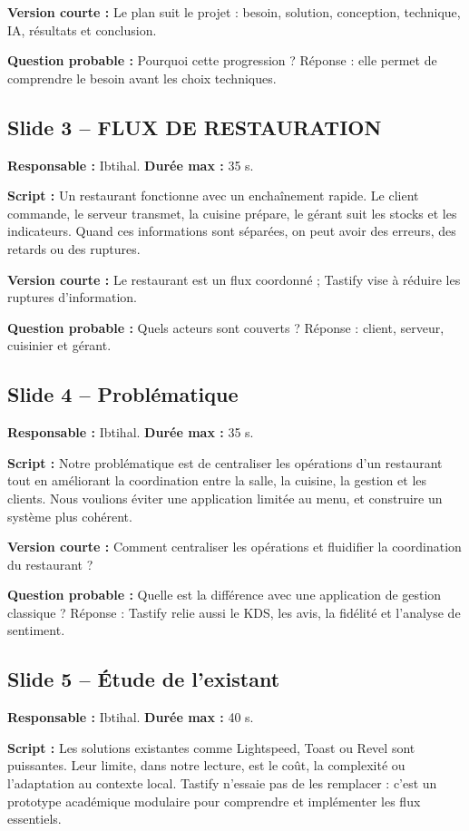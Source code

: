 \documentclass[11pt,a4paper]{article}
\begin{document}
\textbf{Version courte :} Le plan suit le projet : besoin, solution, conception, technique, IA, résultats et conclusion.

\textbf{Question probable :} Pourquoi cette progression ? Réponse : elle permet de comprendre le besoin avant les choix techniques.

\subsection*{Slide 3 -- FLUX DE RESTAURATION}
\textbf{Responsable :} Ibtihal. \textbf{Durée max :} 35 s.

\textbf{Script :} Un restaurant fonctionne avec un enchaînement rapide. Le client commande, le serveur transmet, la cuisine prépare, le gérant suit les stocks et les indicateurs. Quand ces informations sont séparées, on peut avoir des erreurs, des retards ou des ruptures.

\textbf{Version courte :} Le restaurant est un flux coordonné ; Tastify vise à réduire les ruptures d'information.

\textbf{Question probable :} Quels acteurs sont couverts ? Réponse : client, serveur, cuisinier et gérant.

\subsection*{Slide 4 -- Problématique}
\textbf{Responsable :} Ibtihal. \textbf{Durée max :} 35 s.

\textbf{Script :} Notre problématique est de centraliser les opérations d'un restaurant tout en améliorant la coordination entre la salle, la cuisine, la gestion et les clients. Nous voulions éviter une application limitée au menu, et construire un système plus cohérent.

\textbf{Version courte :} Comment centraliser les opérations et fluidifier la coordination du restaurant ?

\textbf{Question probable :} Quelle est la différence avec une application de gestion classique ? Réponse : Tastify relie aussi le KDS, les avis, la fidélité et l'analyse de sentiment.

\subsection*{Slide 5 -- Étude de l'existant}
\textbf{Responsable :} Ibtihal. \textbf{Durée max :} 40 s.

\textbf{Script :} Les solutions existantes comme Lightspeed, Toast ou Revel sont puissantes. Leur limite, dans notre lecture, est le coût, la complexité ou l'adaptation au contexte local. Tastify n'essaie pas de les remplacer : c'est un prototype académique modulaire pour comprendre et implémenter les flux essentiels.
\end{document}
